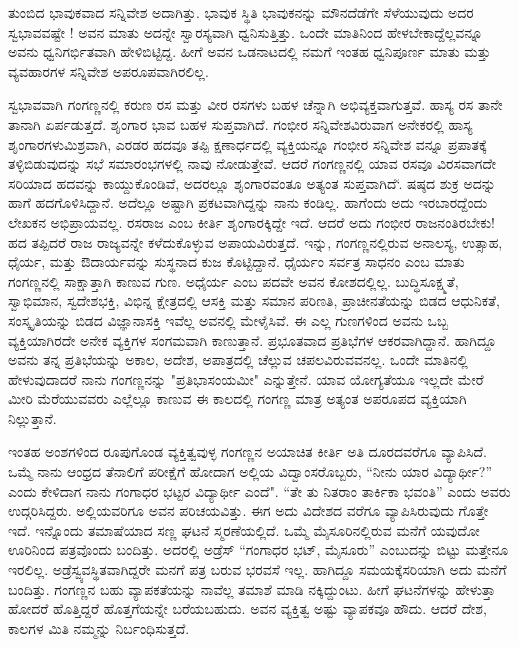 {ತುಂಬಿದ ಭಾವುಕವಾದ ಸನ್ನಿವೇಶ  ಅದಾಗಿತ್ತು. ಭಾವುಕ ಸ್ಥಿತಿ ಭಾವುಕನನ್ನು ಮೌನ\-ದೆಡೆಗೇ ಸೆಳೆಯುವುದು ಅದರ ಸ್ವಭಾವವಷ್ಟೇ ! ಅವನ ಮಾತು ಅದನ್ನೇ ಸ್ವಾರಸ್ಯವಾಗಿ ಧ್ವನಿಸುತ್ತಿತ್ತು. ಒಂದೇ ಮಾತಿನಿಂದ ಹೇಳಬೇಕಾದ್ದೆಲ್ಲವನ್ನೂ ಅವನು ಧ್ವನಿಗರ್ಭಿತವಾಗಿ \hbox{ಹೇಳಿಬಿಟ್ಟಿದ್ದ.} ಹೀಗೆ ಅವನ ಒಡನಾಟದಲ್ಲಿ ನಮಗೆ ಇಂತಹ ಧ್ವನಿಪೂರ್ಣ ಮಾತು ಮತ್ತು ವ್ಯವಹಾರಗಳ ಸನ್ನಿವೇಶ ಅಪರೂಪವಾಗಿರಲಿಲ್ಲ. 

ಸ್ವಭಾವವಾಗಿ ಗಂಗಣ್ಣನಲ್ಲಿ ಕರುಣ ರಸ ಮತ್ತು ವೀರ ರಸಗಳು ಬಹಳ ಚೆನ್ನಾಗಿ ಅಭಿವ್ಯಕ್ತವಾಗುತ್ತವೆ. ಹಾಸ್ಯ ರಸ ತಾನೇ ತಾನಾಗಿ ಏರ್ಪಡುತ್ತದೆ. ಶೃಂಗಾರ ಭಾವ ಬಹಳ ಸುಪ್ತವಾಗಿದೆ. ಗಂಭೀರ ಸನ್ನಿವೇಶವಿರುವಾಗ ಅನೇಕರಲ್ಲಿ ಹಾಸ್ಯ ಶೃಂಗಾರಗಳು\break ಮಿಶ್ರವಾಗಿ, ಎರಡರ ಹದವೂ ತಪ್ಪಿ ಕ್ಷಣಾರ್ಧದಲ್ಲಿ ವ್ಯಕ್ತಿಯನ್ನೂ  ಗಂಭೀರ \hbox{ಸನ್ನಿವೇಶ} ವನ್ನೂ ಪ್ರಪಾತಕ್ಕೆ ತಳ್ಳಿಬಿಡುವುದನ್ನು  ಸಭೆ ಸಮಾರಂಭಗಳಲ್ಲಿ ನಾವು ನೋಡುತ್ತೇವೆ. ಆದರೆ ಗಂಗಣ್ಣನಲ್ಲಿ ಯಾವ ರಸವೂ ವಿರಸವಾಗದೇ ಸರಿಯಾದ ಹದವನ್ನು ಕಾಯ್ದು\-ಕೊಂಡಿವೆ, ಅದರಲ್ಲೂ ಶೃಂಗಾರವಂತೂ ಅತ್ಯಂತ ಸುಪ್ತವಾಗಿದೆ‘. ಷಷ್ಠದ ಶುಕ್ರ ಅದನ್ನು ಹಾಗೆ ಹದಗೊಳಿಸಿದ್ದಾನೆ.  ಅದೆಲ್ಲೂ ಅಷ್ಟಾಗಿ ಪ್ರಕಟವಾಗಿದ್ದನ್ನು ನಾನು ಕಂಡಿಲ್ಲ. ಹಾಗೆಂದು ಅದು ಇರಬಾರದ್ದೆಂದು ಲೇಖಕನ ಅಭಿಪ್ರಾಯವಲ್ಲ. ರಸರಾಜ ಎಂಬ ಕೀರ್ತಿ ಶೃಂಗಾರಕ್ಕಿದ್ದೇ ಇದೆ. ಆದರೆ ಅದು ಗಂಭೀರ ರಾಜನಂತಿರಬೇಕು! ಹದ \hbox{ತಪ್ಪಿದರೆ} ರಾಜ ರಾಜ್ಯವನ್ನೇ ಕಳೆದುಕೊಳ್ಳುವ ಅಪಾಯವಿರುತ್ತದೆ. ಇನ್ನು, ಗಂಗಣ್ಣನಲ್ಲಿರುವ \hbox{ಅನಾಲಸ್ಯ,} ಉತ್ಸಾಹ, ಧೈರ್ಯ, ಮತ್ತು ಔದಾರ್ಯವನ್ನು ಸುಸ್ಥನಾದ ಕುಜ \hbox{ಕೊಟ್ಟಿದ್ದಾನೆ.} \hbox{ಧೈರ್ಯಂ} ಸರ್ವತ್ರ ಸಾಧನಂ ಎಂಬ ಮಾತು ಗಂಗಣ್ಣನಲ್ಲಿ ಸಾಕ್ಷಾತ್ತಾಗಿ ಕಾಣುವ ಗುಣ. \hbox{ಅಧೈರ್ಯ} ಎಂಬ ಪದವೇ ಅವನ ಕೋಶದಲ್ಲಿಲ್ಲ. ಬುದ್ಧಿಸೂಕ್ಷ್ಮತೆ, ಸ್ವಾಭಿಮಾನ, ಸ್ವದೇಶಭಕ್ತಿ, ವಿಭಿನ್ನ ಕ್ಷೇತ್ರದಲ್ಲಿ ಆಸಕ್ತಿ ಮತ್ತು ಸಮಾನ ಪರಿಣತಿ, ಪ್ರಾಚೀನತೆಯನ್ನು ಬಿಡದ ಆಧುನಿಕತೆ, \hbox{ಸಂಸ್ಕೃತಿಯನ್ನು} ಬಿಡದ ವಿಜ್ಞಾನಾಸಕ್ತಿ ಇವೆಲ್ಲ ಅವನಲ್ಲಿ ಮೇಳೈಸಿವೆ. ಈ ಎಲ್ಲ ಗುಣಗಳಿಂದ ಅವನು ಒಬ್ಬ ವ್ಯಕ್ತಿಯಾಗಿರದೇ ಅನೇಕ ವ್ಯಕ್ತಿಗಳ ಸಂಗಮವಾಗಿ ಕಾಣುತ್ತಾನೆ. ಪ್ರಭೂತವಾದ ಪ್ರತಿಭೆಗಳ ಆಕರವಾಗಿದ್ದಾನೆ. ಹಾಗಿದ್ದೂ ಅವನು ತನ್ನ \hbox{ಪ್ರತಿಭೆಯನ್ನು} ಅಕಾಲ, ಅದೇಶ, ಅಪಾತ್ರದಲ್ಲಿ ಚೆಲ್ಲುವ \hbox{ಚಪಲವಿರುವವನಲ್ಲ.} ಒಂದೇ \hbox{ಮಾತಿನಲ್ಲಿ} ಹೇಳುವುದಾದರೆ ನಾನು ಗಂಗಣ್ಣನನ್ನು "ಪ್ರತಿಭಾಸಂಯಮೀ" ಎನ್ನುತ್ತೇನೆ. ಯಾವ ಯೋಗ್ಯತೆಯೂ ಇಲ್ಲದೇ ಮೇರೆ ಮೀರಿ ಮೆರೆಯುವವರು ಎಲ್ಲೆಲ್ಲೂ ಕಾಣುವ ಈ \hbox{ಕಾಲದಲ್ಲಿ} ಗಂಗಣ್ಣ ಮಾತ್ರ ಅತ್ಯಂತ ಅಪರೂಪದ ವ್ಯಕ್ತಿಯಾಗಿ ನಿಲ್ಲುತ್ತಾನೆ.  

ಇಂತಹ ಅಂಶಗಳಿಂದ ರೂಪುಗೊಂಡ ವ್ಯಕ್ತಿತ್ವವುಳ್ಳ ಗಂಗಣ್ಣನ \hbox{ಅಯಾಚಿತ} ಕೀರ್ತಿ ಅತಿ ದೂರದವರೆಗೂ ವ್ಯಾಪಿಸಿದೆ. ಒಮ್ಮೆ ನಾನು ಆಂಧ್ರದ ತೆನಾಲಿಗೆ \hbox{ಪರೀಕ್ಷೆಗೆ} ಹೋದಾಗ ಅಲ್ಲಿಯ ವಿದ್ವಾಂಸರೊಬ್ಬರು, “ನೀನು ಯಾರ \hbox{ವಿದ್ಯಾರ್ಥೀ?”} ಎಂದು ಕೇಳಿದಾಗ ನಾನು ಗಂಗಾಧರ ಭಟ್ಟರ ವಿದ್ಯಾರ್ಥೀ ಎಂದೆ". “ತೇ ತು \hbox{ನಿತರಾಂ} \hbox{ತಾರ್ಕಿಕಾ} ಭವಂತಿ” ಎಂದು ಅವರು ಉದ್ಗರಿಸಿದ್ದರು. ಅಲ್ಲಿಯವರಿಗೂ ಅವನ \hbox{ಪರಿಚಯವಿತ್ತು.} ಈಗ ಅದು ವಿದೇಶದ ವರೆಗೂ ವ್ಯಾಪಿಸಿರುವುದು ಗೊತ್ತೇ ಇದೆ.  ಇನ್ನೊಂದು ತಮಾಷೆಯಾದ ಸಣ್ಣ ಘಟನೆ ಸ್ಮರಣೆಯಲ್ಲಿದೆ. ಒಮ್ಮೆ \hbox{ಮೈಸೂರಿನಲ್ಲಿರುವ} ಮನೆಗೆ ಯವುದೋ ಊರಿನಿಂದ ಪತ್ರವೊಂದು ಬಂದಿತ್ತು. ಅದರಲ್ಲಿ ಅಡ್ರೆಸ್ \enginline{-}\break “ಗಂಗಾಧರ ಭಟ್, ಮೈಸೂರು” ಎಂಬುದನ್ನು ಬಿಟ್ಟು ಮತ್ತೇನೂ ಇರಲಿಲ್ಲ.  ಅಡ್ರೆಸ್\break ವ್ಯವಸ್ಥಿತವಾಗಿದ್ದರೇ ಮನಗೆ ಪತ್ರ ಬರುವ ಭರವಸೆ ಇಲ್ಲ. ಹಾಗಿದ್ದೂ ಸಮಯಕ್ಕೆ\break ಸರಿಯಾಗಿ ಅದು ಮನೆಗೆ ಬಂದಿತ್ತು. ಗಂಗಣ್ಣನ ಬಹು ವ್ಯಾಪಕತೆಯನ್ನು ನಾವೆಲ್ಲ \hbox{ತಮಾಶೆ} ಮಾಡಿ ನಕ್ಕಿದ್ದುಂಟು. ಹೀಗೆ ಘಟನೆಗಳನ್ನು ಹೇಳುತ್ತಾ ಹೋದರೆ ಹೊತ್ತಿದ್ದರೆ ಹೊತ್ತಗೆಯನ್ನೇ ಬರೆಯ\-ಬಹುದು. ಅವನ ವ್ಯಕ್ತಿತ್ವ ಅಷ್ಟು ವ್ಯಾಪಕವೂ ಹೌದು. ಆದರೆ ದೇಶ, ಕಾಲಗಳ ಮಿತಿ ನಮ್ಮನ್ನು ನಿರ್ಬಂಧಿಸುತ್ತದೆ. 

}
